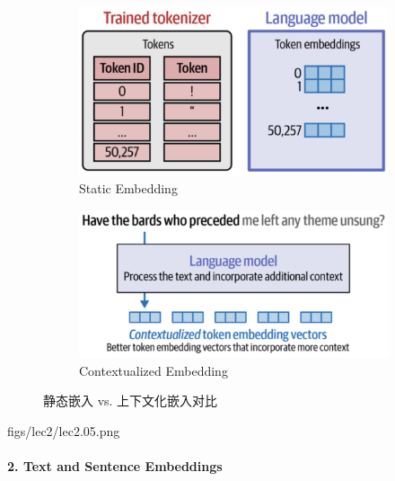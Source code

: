 \begin{figure}[H]
  \centering
  \begin{subfigure}[t]{0.45\linewidth}
    \centering
    \includegraphics[width=\linewidth]{figs/lec2/lec2.03.png}
    \caption{Static Embedding}
    \label{fig:static-embedding}
  \end{subfigure}
  \hfill
  \begin{subfigure}[t]{0.45\linewidth}
    \centering
    \includegraphics[width=\linewidth]{figs/lec2/lec2.04.png}
    \caption{Contextualized Embedding}
    \label{fig:contextualized-embedding}
  \end{subfigure}
  \caption{静态嵌入 vs. 上下文化嵌入对比}
  \label{fig:embeddings-comparison}
\end{figure}

\MarginImageWithNote
  {figs/lec2/lec2.05.png}
  {}

\paragraph{2. Text and Sentence Embeddings}~{}
        
